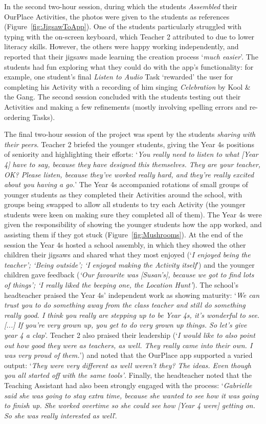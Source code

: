 \documentclass[,hyphens]{sigchi}
\begin{document}
In the second two-hour session, during which the students \textit{Assembled} their OurPlace Activities, the photos were given to the students as references   (Figure~\ref{fig:JigsawToApp}). One of the students particularly struggled with typing with the on-screen keyboard, which Teacher 2 attributed to due to lower literacy skills. However, the others were happy working independently, and reported that their jigsaws made learning the creation process `\textit{much easier}'. The students had fun exploring what they could do with the app's functionality: for example, one student's final \textit{Listen to Audio} Task `rewarded' the user for completing his Activity with a recording of him singing \textit{Celebration} by Kool \& the Gang. The second session concluded with the students testing out their Activities and making a few refinements (mostly involving spelling errors and re-ordering Tasks). 

The final two-hour session of the project was spent by the students \textit{sharing with their peers}. Teacher 2 briefed the younger students, giving the Year 4s positions of seniority and highlighting their efforts: `\textit{You really need to listen to what [Year 4] have to say, because they have designed this themselves. They are your teacher, OK? Please listen, because they've worked really hard, and they're really excited about you having a go.}' The Year 4s accompanied rotations of small groups of younger students as they completed their Activities around the school, with groups being swapped to allow all students to try each Activity (the younger students were keen on making sure they completed all of them). The Year 4s were given the responsibility of showing the younger students how the app worked, and assisting them if they got stuck (Figure~\ref{fig:Mushrooms}). At the end of the session the Year 4s hosted a school assembly, in which they showed the other children their jigsaws and shared what they most enjoyed (`\textit{I enjoyed being the teacher'; `Being outside'; `I enjoyed making the Activity itself}') and the younger children gave feedback (\textit{`Our favourite was [Susan's], because we got to find lots of things'; `I really liked the beeping one, the Location Hunt'}). The school's headteacher praised the Year 4s' independent work as showing maturity: `\textit{We can trust you to do something away from the class teacher and still do something really good. I think you really are stepping up to be Year 4s, it's wonderful to see. [...] If you're very grown up, you get to do very grown up things. So let's give year 4 a clap}'. Teacher 2 also praised their leadership (`\textit{I would like to also point out how good they were as teachers, as well. They really came into their own. I was very proud of them.}') and noted that the OurPlace app supported a varied output: `\textit{They were very different as well weren't they? The ideas. Even though you all started off with the same tools'}. Finally, the headteacher noted that the Teaching Assistant had also been strongly engaged with the process: `\textit{Gabrielle said she was going to stay extra time, because she wanted to see how it was going to finish up. She worked overtime so she could see how [Year 4 were] getting on. So she was really interested as well}'.
\end{document}
